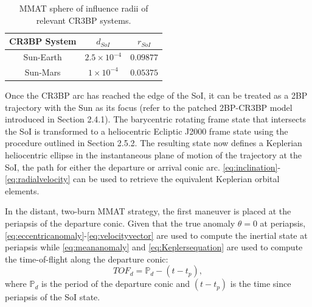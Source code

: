 \begin{table}[ht]
    \centering
    \caption{MMAT sphere of influence radii of relevant CR3BP systems.}
    \begin{tabular}{|c|c|c|}
        \hline
        \textbf{CR3BP System}   &   \boldmath$d_{SoI}$  &   \boldmath$r_{SoI}$  \\  \hline
        Sun-Earth               &   $2.5\times10^{-4}$  &   $0.09877$           \\  \hline
        Sun-Mars                &   $1\times10^{-4}$    &   $0.05375$           \\  \hline
    \end{tabular}
    \label{tab:SoI}
\end{table}

Once the CR3BP arc has reached the edge of the SoI, it can be treated as a 2BP trajectory with the
Sun as its focus (refer to the patched 2BP-CR3BP model introduced in Section 2.4.1). The
barycentric rotating frame state that intersects the SoI is transformed to a heliocentric Ecliptic
J2000 frame state using the procedure outlined in Section 2.5.2. The resulting state now defines a
Keplerian heliocentric ellipse in the instantaneous plane of motion of the trajectory at the SoI,
the path for either the departure or arrival conic arc.
\cref{eq:inclination}-\cref{eq:radialvelocity} can be used to retrieve the equivalent Keplerian
orbital elements.

In the distant, two-burn MMAT strategy, the first maneuver is placed at the periapsis of the
departure conic. Given that the true anomaly $\theta=0$ at periapsis,
\cref{eq:eccentricanomaly}-\cref{eq:velocityvector} are used to compute the inertial state at
periapsis while \cref{eq:meananomaly} and \cref{eq:Keplersequation} are used to compute the
time-of-flight along the departure conic:
\begin{equation}
    TOF_{d}=\mathbb{P}_{d}-(t-t_{p}),
    \label{eq:departureTOF}
\end{equation}
where $\mathbb{P}_{d}$ is the period of the departure conic and $(t-t_{p})$ is the time since
periapsis of the SoI state.


